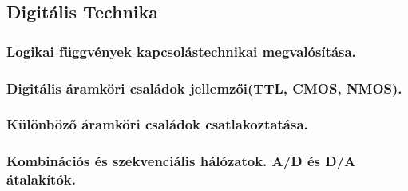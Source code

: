 \subsection{Digitális Technika}
\subsubsection{Logikai függvények kapcsolástechnikai megvalósítása.}

\subsubsection{Digitális áramköri családok jellemzői(TTL, CMOS, NMOS).}

\subsubsection{Különböző áramköri családok csatlakoztatása.}

\subsubsection{Kombinációs és szekvenciális hálózatok. A/D és D/A átalakítók.}
